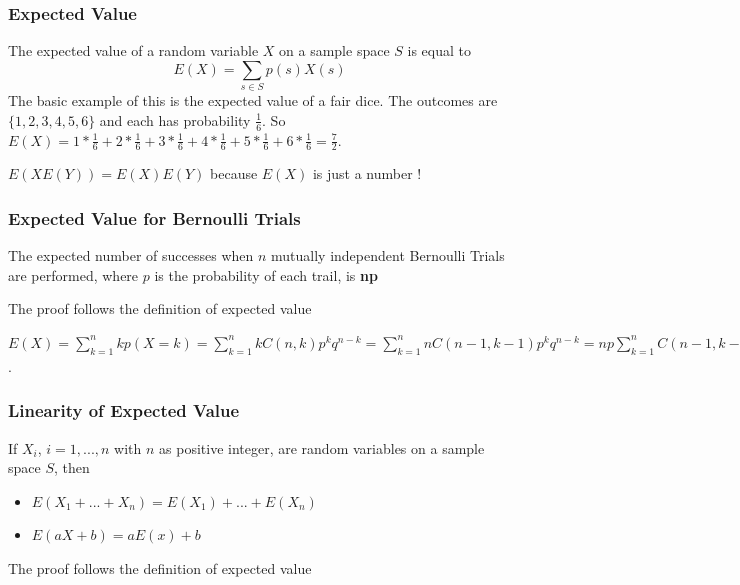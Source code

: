 \documentclass{article}
\begin{document}
\subsubsection{Expected Value} The expected value of a random variable $ X $ on a sample space $ S $ is equal to
\begin{equation}
E(X) = \sum_{s \in S}p(s)X(s)
\end{equation} 
The basic example of this is the expected value of a fair dice. The outcomes are $ \{1,2,3,4,5,6\} $ and each has probability $ \frac{1}{6} $. So $ E(X) = 1*\frac{1}{6} + 2*\frac{1}{6} + 3*\frac{1}{6} + 4*\frac{1}{6} + 5*\frac{1}{6} + 6*\frac{1}{6} = \frac{7}{2} $.

\begin{tcolorbox}[width=12.1cm, leftrule=3mm]
$ E(XE(Y)) = E(X)E(Y) $ because $ E(X) $ is just a number !
\end{tcolorbox}

\subsubsection{Expected Value for Bernoulli Trials}
\begin{tcolorbox}[sharp corners, colback=green!30, colframe=green!80!blue, title=Expected Value for Bernoulli Trials]
The expected number of successes when $ n $ mutually independent Bernoulli Trials are performed, where $ p $ is the probability of each trail, is \textbf{np}
\end{tcolorbox}
The proof follows the definition of expected value

\begin{tcolorbox}[width=12.1cm]
$ E(X) = \sum_{k=1}^n kp(X = k) = \sum_{k=1}^n kC(n,k)p^kq^{n-k} = \sum_{k=1}^n nC(n-1,k -1)p^kq^{n-k} = np \sum_{k=1}^n C(n-1,k-1)p^{k-1}q^{n-k} = np \sum_{j=1}^{n-1} C(n-1,j)p^{j}q^{n-1-j} = np(p+q)^{n-1} = np $. 
\end{tcolorbox}

\subsubsection{Linearity of Expected Value} If $ X_i $, $ i = 1,...,n $ with $ n $ as positive integer, are random variables on a sample space $ S $, then
\begin{itemize}
\item $ E(X_1 + ... + X_n) = E(X_1) + ... + E(X_n) $
\item $ E(aX + b) = aE(x) + b $
\end{itemize}
The proof follows the definition of expected value
\end{document}
